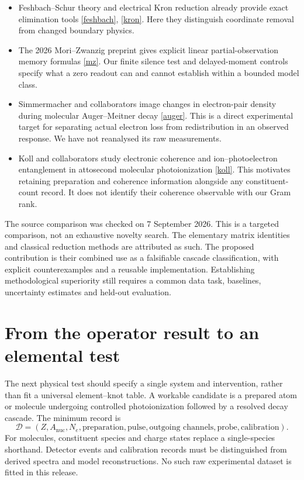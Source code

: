 \documentclass[11pt]{article}
\begin{document}
\begin{itemize}[leftmargin=*]
\item Feshbach--Schur theory and electrical Kron reduction already provide exact elimination tools \href{https://arxiv.org/abs/0704.3244}{[feshbach]}, \href{https://arxiv.org/abs/1102.2950}{[kron]}. Here they distinguish coordinate removal from changed boundary physics.
\item The 2026 Mori--Zwanzig preprint gives explicit linear partial-observation memory formulas \href{https://arxiv.org/abs/2606.23341}{[mz]}. Our finite silence test and delayed-moment controls specify what a zero readout can and cannot establish within a bounded model class.
\item Simmermacher and collaborators image changes in electron-pair density during molecular Auger--Meitner decay \href{https://doi.org/10.1038/s41567-026-03363-8}{[auger]}. This is a direct experimental target for separating actual electron loss from redistribution in an observed response. We have not reanalysed its raw measurements.
\item Koll and collaborators study electronic coherence and ion--photoelectron entanglement in attosecond molecular photoionization \href{https://doi.org/10.1038/s41586-026-10230-2}{[koll]}. This motivates retaining preparation and coherence information alongside any constituent-count record. It does not identify their coherence observable with our Gram rank.
\end{itemize}

The source comparison was checked on 7 September 2026. This is a targeted comparison, not an exhaustive novelty search. The elementary matrix identities and classical reduction methods are attributed as such. The proposed contribution is their combined use as a falsifiable cascade classification, with explicit counterexamples and a reusable implementation. Establishing methodological superiority still requires a common data task, baselines, uncertainty estimates and held-out evaluation.

\section{From the operator result to an elemental test}
The next physical test should specify a single system and intervention, rather than fit a universal element--knot table. A workable candidate is a prepared atom or molecule undergoing controlled photoionization followed by a resolved decay cascade. The minimum record is
\begin{equation}
\mathcal D=(Z,A_{\mathrm{nuc}},N_e,\text{preparation},\text{pulse},\text{outgoing channels},\text{probe},\text{calibration}).
\end{equation}
For molecules, constituent species and charge states replace a single-species shorthand. Detector events and calibration records must be distinguished from derived spectra and model reconstructions. No such raw experimental dataset is fitted in this release.
\end{document}
